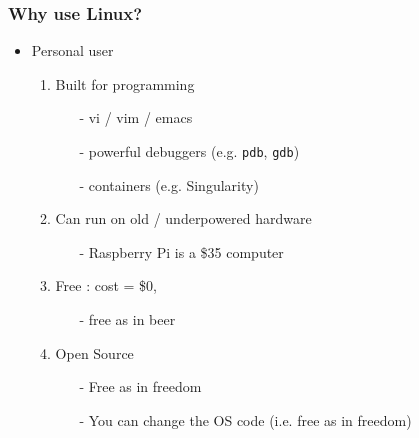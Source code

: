 \documentclass{beamer}
\newcommand{\code}[1]{\colorbox{codegray}{\texttt{#1}}}
\begin{document}
\begin{frame}
\frametitle{Why use Linux?}
\begin{itemize}
    \item Personal user
    \pause
    \begin{enumerate}
        \item Built for programming
        \begin{itemize}
            \pause
            \item[-] vi / vim / emacs
            \pause
            \item[-] powerful debuggers (e.g. \code{pdb}, \code{gdb})
            \pause
            \item[-] containers (e.g. Singularity)
        \end{itemize}
        \pause
        \item Can run on old / underpowered hardware
        \begin{itemize}
            \item[-] Raspberry Pi is a \$35 computer
        \end{itemize}
        \pause
        \item Free : cost = \$0, 
        \pause
        \begin{itemize}
            \item[-] free as in beer
        \end{itemize}
        \pause
        \item Open Source 
        \begin{itemize}
            \pause
            \item[-] Free as in freedom 
            \pause
            \item[-] You can change the OS code (i.e. free as in freedom)
        \end{itemize}
    \end{enumerate}
\end{itemize}
\end{frame}
\end{document}
